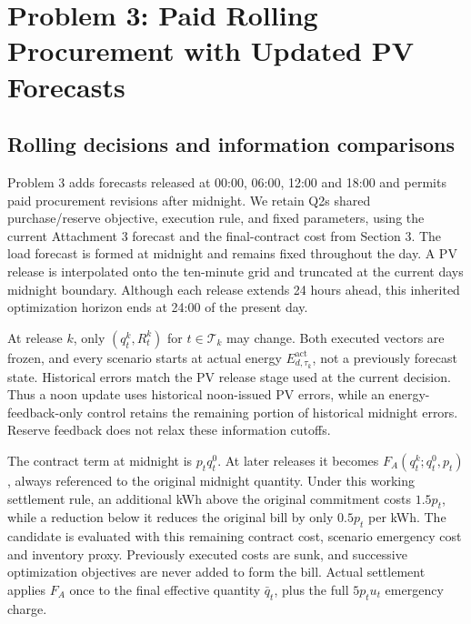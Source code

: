 \section{Problem 3: Paid Rolling Procurement with Updated PV Forecasts}\label{problem-3-paid-rolling-procurement-with-updated-pv-forecasts}

\subsection{Rolling decisions and information comparisons}\label{rolling-decisions-and-information-comparisons}

\begingroup
{}

Problem 3 adds forecasts released at 00:00, 06:00, 12:00 and 18:00 and permits paid procurement revisions after midnight. We retain Q2\textquotesingle s shared purchase/reserve objective, execution rule, and fixed parameters, using the current Attachment 3 forecast and the final-contract cost from Section 3. The load forecast is formed at midnight and remains fixed throughout the day. A PV release is interpolated onto the ten-minute grid and truncated at the current day\textquotesingle s midnight boundary. Although each release extends 24 hours ahead, this inherited optimization horizon ends at 24:00 of the present day.

\par
\endgroup

At release \(k\), only \((q_t^k,R_t^k)\) for \(t\in\mathcal T_k\) may change. Both executed vectors are frozen, and every scenario starts at actual energy \(E^{\mathrm{act}}_{d,\tau_k}\), not a previously forecast state. Historical errors match the PV release stage used at the current decision. Thus a noon update uses historical noon-issued PV errors, while an energy-feedback-only control retains the remaining portion of historical midnight errors. Reserve feedback does not relax these information cutoffs.

The contract term at midnight is \(p_tq^0_t\). At later releases it becomes \(F_A(q^k_t;q^0_t,p_t)\), always referenced to the original midnight quantity. Under this working settlement rule, an additional kWh above the original commitment costs \(1.5p_t\), while a reduction below it reduces the original bill by only \(0.5p_t\) per kWh. The candidate is evaluated with this remaining contract cost, scenario emergency cost and inventory proxy. Previously executed costs are sunk, and successive optimization objectives are never added to form the bill. Actual settlement applies \(F_A\) once to the final effective quantity \(\bar q_t\), plus the full \(5p_tu_t\) emergency charge.

